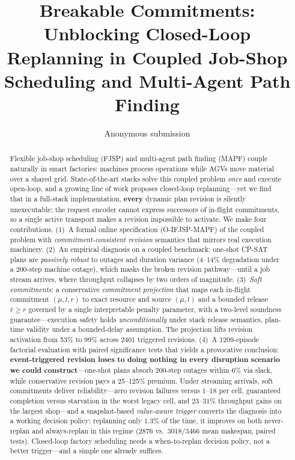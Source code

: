 \documentclass[twocolumn]{article}
\title{Breakable Commitments: Unblocking Closed-Loop\\
Replanning in Coupled Job-Shop Scheduling and Multi-Agent Path Finding}
\author{Anonymous submission}
\date{}
\begin{document}
\maketitle

\begin{abstract}
Flexible job-shop scheduling (FJSP) and multi-agent path finding (MAPF)
couple naturally in smart factories: machines process operations while
AGVs move material over a shared grid. State-of-the-art stacks solve this
coupled problem \emph{once} and execute open-loop, and a growing line of
work proposes closed-loop replanning---yet we find that in a full-stack
implementation, \textbf{every} dynamic plan revision is silently
unexecutable: the request encoder cannot express successors of
in-flight commitments, so a single active transport makes a revision
impossible to activate. We make four contributions.
(1)~A formal online specification (O-IFJSP-MAPF) of the coupled problem
with \emph{commitment-consistent revision} semantics that mirrors real
execution machinery. (2)~An empirical diagnosis on a coupled benchmark:
one-shot CP-SAT plans are \emph{passively robust} to outages and duration
variance (4--14\% degradation under a 200-step machine outage), which
masks the broken revision pathway---until a job stream arrives, where
throughput collapses by two orders of magnitude.
(3)~\emph{Soft commitments}: a conservative \emph{commitment
projection} that maps each in-flight commitment $(\mu,l,r)$ to exact
resource and source $(\mu,l)$ and a bounded release $\bar r\ge r$
governed by a single interpretable penalty parameter, with a
two-level soundness guarantee---execution safety holds
\emph{unconditionally} under stack release semantics, plan-time validity
under a bounded-delay assumption. The projection lifts revision
activation from 53\% to 99\% across 2401 triggered revisions.
(4)~A 1209-episode factorial evaluation with paired significance tests
that yields a provocative conclusion: \textbf{event-triggered revision
loses to doing nothing in every disruption scenario we could
construct}---one-shot plans absorb 200-step outages within 6\% via
slack, while conservative revision pays a 25--125\% premium. Under
streaming arrivals, soft commitments deliver reliability---zero
revision failures versus $1$--$18$ per cell, guaranteed completion
versus starvation in the worst legacy cell, and $23$--$31\%$ throughput
gains on the largest shop---and a snapshot-based \emph{value-aware
trigger} converts the diagnosis into a working decision policy:
replanning only $1.3\%$ of the time, it improves on both never-replan
and always-replan in this regime ($2876$ vs.\ $3018$/$3466$ mean
makespan, paired tests). Closed-loop factory scheduling needs a
when-to-replan decision policy, not a better trigger---and a simple
one already suffices.
\end{abstract}
\end{document}
